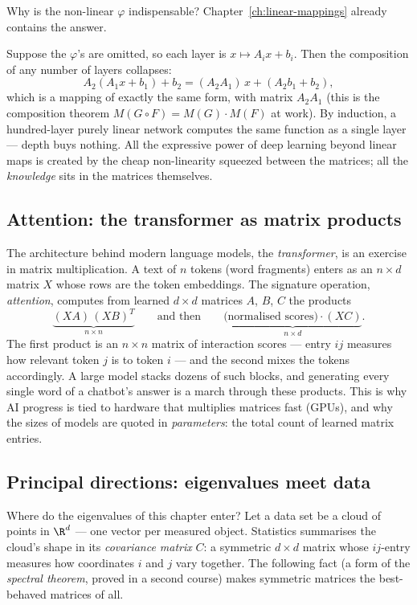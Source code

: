 Why is the non-linear $\varphi$ indispensable? Chapter~\ref{ch:linear-mappings} already contains the
answer.

\begin{observation}
Suppose the $\varphi$'s are omitted, so each layer is $x\mapsto A_i x + b_i$. Then the composition of any
number of layers collapses:
\[
A_2(A_1 x + b_1) + b_2 = (A_2 A_1)\, x + (A_2 b_1 + b_2),
\]
which is a mapping of exactly the same form, with matrix $A_2 A_1$
(this is the composition theorem $M(G\circ F) = M(G)\cdot M(F)$ at work). By induction, a
hundred-layer purely linear network computes the same function as a single layer — depth buys nothing.
All the expressive power of deep learning beyond linear maps is created by the cheap non-linearity
squeezed between the matrices; all the \emph{knowledge} sits in the matrices themselves.
\end{observation}

\subsection{Attention: the transformer as matrix products}

The architecture behind modern language models, the \emph{transformer}, is an exercise in matrix
multiplication. A text of $n$ tokens (word fragments) enters as an $n\times d$ matrix $X$ whose rows are
the token embeddings. The signature operation, \emph{attention}, computes from learned $d\times d$
matrices $A$, $B$, $C$ the products
\[
\underbrace{(X A)\,(X B)^T}_{n\times n} \qquad\text{and then}\qquad
\underbrace{\big(\text{normalised scores}\big)\cdot (X C)}_{n\times d}.
\]
The first product is an $n\times n$ matrix of interaction scores — entry $ij$ measures how relevant token
$j$ is to token $i$ — and the second mixes the tokens accordingly. A large model stacks dozens of such
blocks, and generating every single word of a chatbot's answer is a march through these products. This is
why AI progress is tied to hardware that multiplies matrices fast (GPUs), and why the sizes of models are
quoted in \emph{parameters}: the total count of learned matrix entries.

\subsection{Principal directions: eigenvalues meet data}

Where do the eigenvalues of this chapter enter? Let a data set be a cloud of points in $\R^d$ — one
vector per measured object. Statistics summarises the cloud's shape in its \emph{covariance matrix} $C$:
a symmetric $d\times d$ matrix whose $ij$-entry measures how coordinates $i$ and $j$ vary together. The
following fact (a form of the \emph{spectral theorem}, proved in a second course) makes symmetric
matrices the best-behaved matrices of all.

